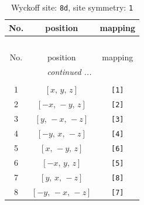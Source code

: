 \documentclass[fleqn,8pt]{jsarticle}
\begin{document}
\begin{longtable}{ccc}
\caption{Wyckoff site: {\tt 8d}, site symmetry: {\tt 1}}
 \\
 \hline \hline
No. & position & mapping \\ \hline \endfirsthead

\multicolumn{2}{l}{\tablename\ \thetable{}} \\
 \hline \hline
No. & position & mapping \\ \hline \endhead

 \hline \hline
\multicolumn{2}{r}{\footnotesize\it continued ...} \\ \endfoot

 \hline \hline
\multicolumn{2}{r}{} \\ \endlastfoot

1 & $\left[ x,\, y,\, z \right]$ & {\tt [1]} \\ \hline
2 & $\left[ - x,\, - y,\, z \right]$ & {\tt [2]} \\ \hline
3 & $\left[ y,\, - x,\, - z \right]$ & {\tt [3]} \\ \hline
4 & $\left[ - y,\, x,\, - z \right]$ & {\tt [4]} \\ \hline
5 & $\left[ x,\, - y,\, z \right]$ & {\tt [6]} \\ \hline
6 & $\left[ - x,\, y,\, z \right]$ & {\tt [5]} \\ \hline
7 & $\left[ y,\, x,\, - z \right]$ & {\tt [8]} \\ \hline
8 & $\left[ - y,\, - x,\, - z \right]$ & {\tt [7]} \\
\end{longtable}
\end{document}
